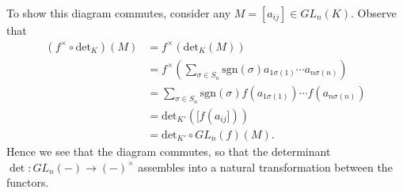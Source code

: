 \begin{example}
        To show this diagram commutes, consider any $M = [a_{ij}] \in GL_n(K)$. Observe that 
        \begin{align*}
            (f^{\times} \circ \text{det}_K)(M)
            &=
            f^{\times}(\text{det}_K(M))\\
            &=
            f^{\times}\left( \sum_{\sigma \in S_n}\text{sgn}(\sigma)a_{1\sigma(1)}\cdots a_{n\sigma(n)} \right)
            \\
            &=
            \sum_{\sigma \in S_n}\text{sgn}(\sigma)f(a_{1\sigma(1)})\cdots f(a_{n\sigma(n)})\\
            &=
            \text{det}_{K'}([f(a_{ij}]))\\
            &=
            \text{det}_{K'} \circ GL_n(f)(M).
        \end{align*}
        Hence we see that the diagram commutes, so that the determinant
        $\det: GL_n(-) \to (-)^{\times}$ assembles into a natural transformation 
        between the functors.
    \end{example}

